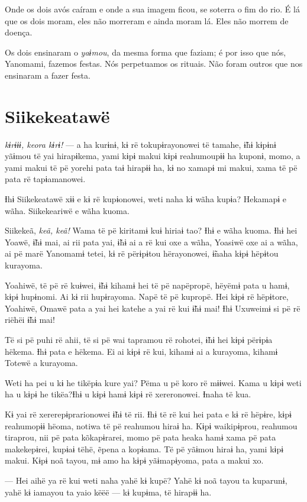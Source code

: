 Onde os dois avós caíram e onde a sua imagem ficou, se soterra o fim do
rio. É lá que os dois moram, eles não morreram e ainda moram lá. Eles
não morrem de doença. 

Os dois ensinaram o \textit{yaɨmou}, da mesma forma que faziam; é por isso que nós, Yanomami, fazemos festas. Nós perpetuamos os rituais. Não foram outros que nos ensinaram a fazer festa.

\chapter{Siikekeatawë}
 
 \textit{kɨrɨɨɨ, keora kɨrɨ!} --- a ha kurɨnɨ, kɨ rë tokupɨrayonowei të
tamahe, ɨ̃hɨ kɨpɨnɨ yãɨmou të yai hirapɨkema, yami kɨpɨ makui kɨpɨ
reahumoupɨɨ ha kuponɨ, momo, a yami makui të pë yorehi pata taɨ hirapɨɨ
ha, kɨ no xamapɨ mi makui, xama të pë pata rë tapɨamanowei. 

Ɨhɨ Siikekeatawë xɨɨ e kɨ rë kupɨonowei, weti naha kɨ wãha kupɨa?
Hekamapɨ e wãha. Siikekeariwë e wãha kuoma. 

Siikekeã, \textit{keã, keã!} Wama të pë kiritamɨ kuɨ hiriaɨ tao? Ɨhɨ e wãha
kuoma. Ɨhɨ hei Yoawë, ɨ̃hɨ mai, ai rii pata yai, ɨ̃hɨ ai a rë kui oxe a
wãha, Yoasiwë oxe ai a wãha, ai pë marë Yanomamɨ tetei, kɨ rë përɨpɨtou
hërayonowei, ɨ̃naha kɨpɨ hëpɨtou kurayoma. 

Yoahiwë, të pë rë kuɨwei, ɨ̃hɨ kihamɨ hei të pë napëpropë, hëyëmɨ pata u
hamɨ, kɨpɨ hupɨnomi. Ai kɨ rii hupɨrayoma. Napë të pë kupropë. Hei kɨpɨ
rë hëpɨtore, Yoahiwë, Omawë pata a yai hei katehe a yai rë kui ɨ̃hɨ mai!
Ɨhɨ Uxuweimɨ si pë rë riëhëi ɨ̃hɨ mai! 

Të si pë puhi rë ahii, të si pë wai tapramou rë rohotei, ɨ̃hɨ hei kɨpɨ
përɨpɨa hëkema. Ɨhɨ pata e hëkema. Ei ai kɨpɨ rë kui, kihamɨ ai a
kurayoma, kihamɨ Totewë a kurayoma. 

Weti ha pei u kɨ he tikëpɨa kure yai? Pëma u pë koro rë mɨɨwei. Kama u
kɨpɨ weti ha u kɨpɨ he tikëa?Ɨhɨ u kɨpɨ hamɨ kɨpɨ rë xereronowei. Ɨnaha
të kua. 

Kɨ yai rë xererepɨprarionowei ɨ̃hɨ të rii. Ɨhɨ të rë kui hei pata e kɨ rë
hëpɨre, kɨpɨ reahumopɨɨ hëoma, notiwa të pë reahumou hiraɨ ha. Kɨpɨ
waikipɨprou, reahumou tiraprou, nii pë pata kõkapɨrarei, momo pë pata
heaka hamɨ xama pë pata makekepɨrei, kupɨaɨ tëhë, ẽpena a kopɨama. Të pë
yãɨmou hiraɨ ha, yami kɨpɨ makui. Kɨpɨ noã tayou, mɨ amo ha kɨpɨ
yãɨmapɨyoma, pata a makui xo. 

--- Hei aihë ya rë kui weti naha yahë kɨ kupë? Yahë kɨ noã tayou ta
kuparunɨ, yahë kɨ iamayou ta yaio këëë --- kɨ kupɨma, të hirapɨɨ ha. 

